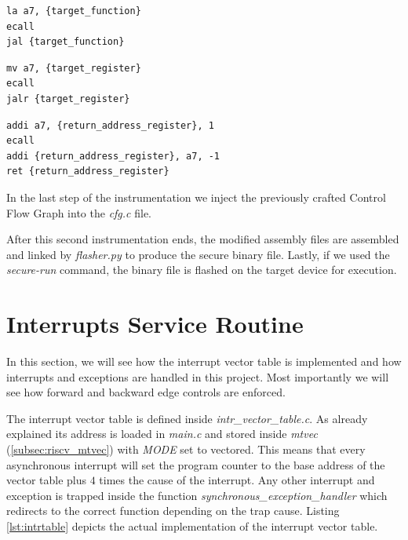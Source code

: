 \begin{lstlisting}[style=Assembly, caption = Direct jump code block, label={lst:dirjumpblock}]
la a7, {target_function}
ecall
jal {target_function}
\end{lstlisting}

\begin{lstlisting}[style=Assembly, caption = Indirect jump code block, label={lst:indirjumpblock}]
mv a7, {target_register}
ecall
jalr {target_register}
\end{lstlisting}

\begin{lstlisting}[style=Assembly, caption = Return code block, label={lst:retblock}]
addi a7, {return_address_register}, 1
ecall
addi {return_address_register}, a7, -1
ret {return_address_register}
\end{lstlisting}

In the last step of the instrumentation we inject the previously crafted Control
Flow Graph into the \textit{cfg.c} file.

After this second instrumentation ends, the modified assembly files are assembled
and linked by \textit{flasher.py} to produce the secure binary file. Lastly, if
we used the \textit{secure-run} command, the binary file is flashed on the
target device for execution.

\section{Interrupts Service Routine}
\label{sec:project_isr}

In this section, we will see how the interrupt vector table is implemented and
how interrupts and exceptions are handled in this project. Most importantly we will
see how forward and backward edge controls are enforced.

The interrupt vector table is defined inside \textit{intr\_vector\_table.c}. As already
explained its address is loaded in \textit{main.c} and stored inside \textit{mtvec}
(\ref{subsec:riscv_mtvec}) with \textit{MODE} set to vectored. This means that every
asynchronous interrupt will set the program counter to the base address of the vector
table plus $4$ times the cause of the interrupt. Any other interrupt and
exception is trapped inside the function \textit{synchronous\_exception\_handler}
which redirects to the correct function depending on the trap cause. Listing
\ref{lst:intrtable} depicts the actual implementation of the interrupt vector
table.

